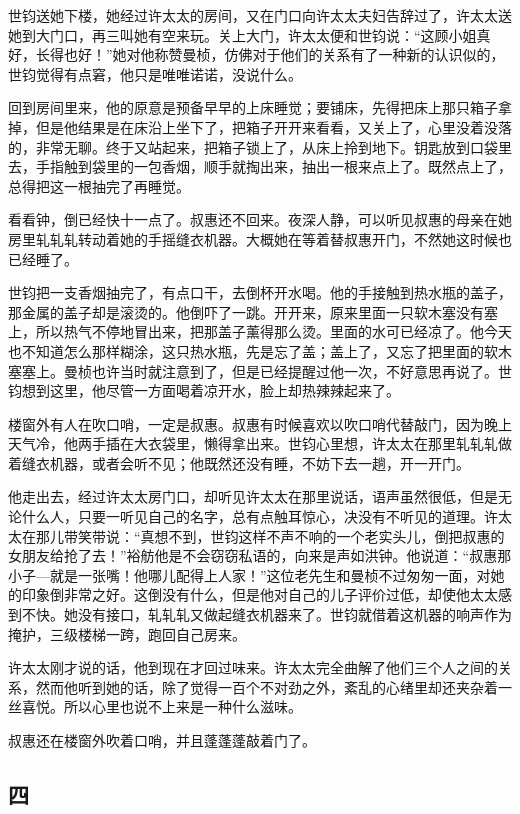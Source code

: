 \par 世钧送她下楼，她经过许太太的房间，又在门口向许太太夫妇告辞过了，许太太送她到大门口，再三叫她有空来玩。关上大门，许太太便和世钧说：“这顾小姐真好，长得也好！”她对他称赞曼桢，仿佛对于他们的关系有了一种新的认识似的，世钧觉得有点窘，他只是唯唯诺诺，没说什么。
\par 回到房间里来，他的原意是预备早早的上床睡觉；要铺床，先得把床上那只箱子拿掉，但是他结果是在床沿上坐下了，把箱子开开来看看，又关上了，心里没着没落的，非常无聊。终于又站起来，把箱子锁上了，从床上拎到地下。钥匙放到口袋里去，手指触到袋里的一包香烟，顺手就掏出来，抽出一根来点上了。既然点上了，总得把这一根抽完了再睡觉。
\par 看看钟，倒已经快十一点了。叔惠还不回来。夜深人静，可以听见叔惠的母亲在她房里轧轧轧转动着她的手摇缝衣机器。大概她在等着替叔惠开门，不然她这时候也已经睡了。
\par 世钧把一支香烟抽完了，有点口干，去倒杯开水喝。他的手接触到热水瓶的盖子，那金属的盖子却是滚烫的。他倒吓了一跳。开开来，原来里面一只软木塞没有塞上，所以热气不停地冒出来，把那盖子薰得那么烫。里面的水可已经凉了。他今天也不知道怎么那样糊涂，这只热水瓶，先是忘了盖；盖上了，又忘了把里面的软木塞塞上。曼桢也许当时就注意到了，但是已经提醒过他一次，不好意思再说了。世钧想到这里，他尽管一方面喝着凉开水，脸上却热辣辣起来了。
\par 楼窗外有人在吹口哨，一定是叔惠。叔惠有时候喜欢以吹口哨代替敲门，因为晚上天气冷，他两手插在大衣袋里，懒得拿出来。世钧心里想，许太太在那里轧轧轧做着缝衣机器，或者会听不见；他既然还没有睡，不妨下去一趟，开一开门。
\par 他走出去，经过许太太房门口，却听见许太太在那里说话，语声虽然很低，但是无论什么人，只要一听见自己的名字，总有点触耳惊心，决没有不听见的道理。许太太在那儿带笑带说：“真想不到，世钧这样不声不响的一个老实头儿，倒把叔惠的女朋友给抢了去！”裕舫他是不会窃窃私语的，向来是声如洪钟。他说道：“叔惠那小子—就是一张嘴！他哪儿配得上人家！”这位老先生和曼桢不过匆匆一面，对她的印象倒非常之好。这倒没有什么，但是他对自己的儿子评价过低，却使他太太感到不快。她没有接口，轧轧轧又做起缝衣机器来了。世钧就借着这机器的响声作为掩护，三级楼梯一跨，跑回自己房来。
\par 许太太刚才说的话，他到现在才回过味来。许太太完全曲解了他们三个人之间的关系，然而他听到她的话，除了觉得一百个不对劲之外，紊乱的心绪里却还夹杂着一丝喜悦。所以心里也说不上来是一种什么滋味。
\par 叔惠还在楼窗外吹着口哨，并且蓬蓬蓬敲着门了。


\subsection{四}

